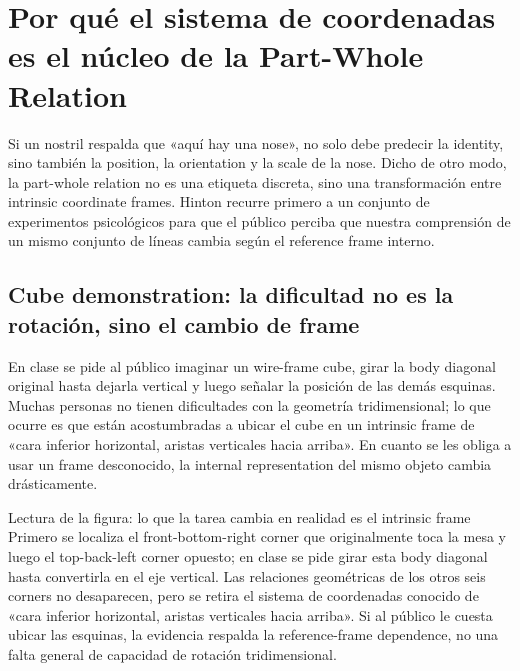 \section{Por qué el sistema de coordenadas es el núcleo de la Part-Whole Relation}

Si un nostril respalda que «aquí hay una nose», no solo debe predecir la identity, sino también la position, la orientation y la scale de la nose. Dicho de otro modo, la part-whole relation no es una etiqueta discreta, sino una transformación entre intrinsic coordinate frames. Hinton recurre primero a un conjunto de experimentos psicológicos para que el público perciba que nuestra comprensión de un mismo conjunto de líneas cambia según el reference frame interno.


\subsection{Cube demonstration: la dificultad no es la rotación, sino el cambio de frame}

En clase se pide al público imaginar un wire-frame cube, girar la body diagonal original hasta dejarla vertical y luego señalar la posición de las demás esquinas. Muchas personas no tienen dificultades con la geometría tridimensional; lo que ocurre es que están acostumbradas a ubicar el cube en un intrinsic frame de «cara inferior horizontal, aristas verticales hacia arriba». En cuanto se les obliga a usar un frame desconocido, la internal representation del mismo objeto cambia drásticamente.


\begin{knowledgebox}{Lectura de la figura: lo que la tarea cambia en realidad es el intrinsic frame}
Primero se localiza el front-bottom-right corner que originalmente toca la mesa y luego el top-back-left corner opuesto; en clase se pide girar esta body diagonal hasta convertirla en el eje vertical. Las relaciones geométricas de los otros seis corners no desaparecen, pero se retira el sistema de coordenadas conocido de «cara inferior horizontal, aristas verticales hacia arriba». Si al público le cuesta ubicar las esquinas, la evidencia respalda la reference-frame dependence, no una falta general de capacidad de rotación tridimensional.
\end{knowledgebox}

